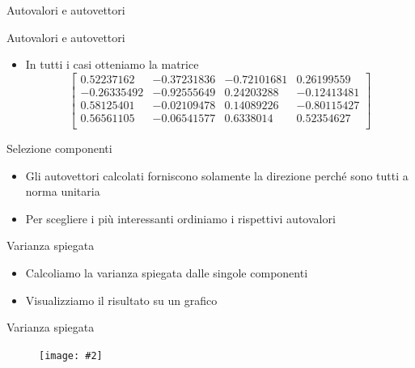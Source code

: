 \documentclass[xcolor={dvipsnames}]{beamer}
\newcommand{\codice}[2]{}
\newcommand{\figcen}[2]{
	\begin{figure}
		\begin{center}
			\texttt{[image: \#2]}
		\end{center}
	\end{figure}
}
\begin{document}
		\begin{frame}{Autovalori e autovettori}
			\codice{61}{82}
		\end{frame}
	
		\begin{frame}{Autovalori e autovettori}
		\codice{84}{94}
			\begin{itemize}
				\item In tutti i casi otteniamo la matrice $$\begin{bmatrix}
				0.52237162 & -0.37231836 & -0.72101681 & 0.26199559\\
				-0.26335492 & -0.92555649 & 0.24203288 & -0.12413481\\
				0.58125401 & -0.02109478 & 0.14089226 & -0.80115427\\
				0.56561105 & -0.06541577 & 0.6338014 & 0.52354627\\
				\end{bmatrix}$$
			\end{itemize}
		\end{frame}
	
		\begin{frame}{Selezione componenti}
			\begin{itemize}
				\item Gli autovettori calcolati forniscono solamente la direzione perché sono tutti a norma unitaria
				\item Per scegliere i più interessanti ordiniamo i rispettivi autovalori
			\end{itemize}
			\codice{96}{102}
		\end{frame}

		\begin{frame}{Varianza spiegata}
			\begin{itemize}
				\item Calcoliamo la varianza spiegata dalle singole componenti
				\item Visualizziamo il risultato su un grafico
			\end{itemize}
			\codice{108}{123}
		\end{frame}

		\begin{frame}{Varianza spiegata}
			\figcen{.75\textwidth}{istoVarianza}
		\end{frame}
	
\end{document}
